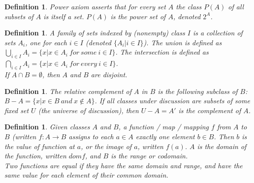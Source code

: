 \documentclass[a4paper,sfsidenotes,openany]{tufte-book}
\theoremstyle{theorem}
\newtheorem{definition}[theorem]{Definition}
\begin{document}
\begin{fullwidth}
\begin{definition}
\textit{{\color{blue} Power axiom}} asserts that for every set $ A $ the class $ P(A) $ of all subsets of $ A $ is itself a set. $ P(A) $ is the \textit{{\color{blue} power set}} of $ A $, denoted $ 2^A $.\\
\end{definition}
\>

\begin{definition}
A \textit{{\color{blue} family of sets}} indexed by (nonempty) class $ I $ is a collection of sets $ A_i $, one for each $ i \in I $ (denoted $\{ A_i | i \in I \}$).\newline
The \textit{{\color{blue} union}} is defined as $ \bigcup\limits_{i \in I}A_{i} = \{ x | x \in A_i \ for \ some \ i \in I \}$.\newline
The \textit{{\color{blue} intersection}} is defined as $ \bigcap\limits_{i \in I}A_{i} = \{ x | x \in A_i \ for \ every \ i \in I \}$.\\
If $ A \cap B = \emptyset $, then $ A $ and $ B $ are disjoint.\\
\end{definition}
\>

\begin{definition}
The \textit{{\color{blue} relative complement}} of $ A $ in $ B $ is the following subclass of $ B $: $ B-A = \{ x | x \in B \ and \ x \notin A \}$.
If all classes under discussion are subsets of some fixed set $ U $ (the universe of discussion), then $ U - A = A' $ is the \textit{{\color{blue} complement}} of $ A $.\\
\end{definition}
\>

\begin{definition}
Given classes $ A $ and $ B $, a \textit{{\color{blue} function / map / mapping}} $ f $ from $ A $ to $ B $ (written $ f: A \rightarrow B $ assigns to each $ a \in A $ exactly one element $ b \in B $.\newline
Then $ b $ is the value of function at $ a $, or the \textit{{\color{blue} image}} of $ a $, written $ f(a) $.\newline
$ A $ is the \textit{{\color{blue} domain}} of the function, written $ dom f $, and $ B $ is the \textit{{\color{blue} range}} or \textit{{\color{blue} codomain}}.\\
Two functions are \textit{{\color{blue} equal}} if they have the same domain and range, and have the same value for each element of their common domain.\\
\end{definition}
\>


\end{fullwidth}
\end{document}
